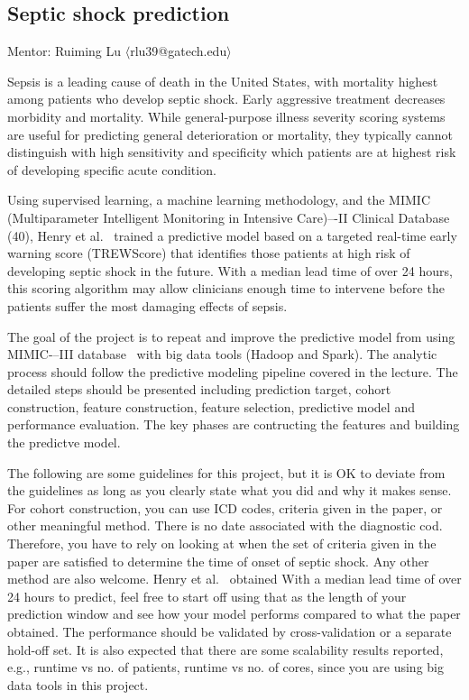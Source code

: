 \documentclass[journal]{IEEEtran}
\begin{document}
\subsection{Septic shock prediction}
Mentor: Ruiming Lu $\langle$rlu39@gatech.edu$\rangle$

Sepsis is a leading cause of death in the United States, with mortality highest among patients who develop septic shock. Early aggressive treatment decreases morbidity and mortality. While general-purpose illness severity scoring systems are useful for predicting general deterioration or mortality, they typically cannot distinguish with high sensitivity and specificity which patients are at highest risk of developing specific acute condition.

Using supervised learning, a machine learning methodology, and the MIMIC (Multiparameter Intelligent Monitoring in Intensive Care)–-II Clinical Database (40), Henry et al.~\cite{henry_targeted_2015} trained a predictive model based on a targeted real-time early warning score (TREWScore) that identifies those patients at high risk of developing septic shock in the future. With a median lead time of over 24 hours, this scoring algorithm may allow clinicians enough time to intervene before the patients suffer the most damaging effects of sepsis.

The goal of the project is to repeat and improve the predictive model from \cite{henry_targeted_2015} using MIMIC-–III database~\cite{saeed_multiparameter_2011} with big data tools (Hadoop and Spark). The analytic process should follow the predictive modeling pipeline covered in the lecture. The detailed steps should be presented including prediction target, cohort construction, feature construction, feature selection, predictive model and performance evaluation. The key phases are contructing the features and building the predictve model.

The following are some guidelines for this project, but it is OK to deviate from the guidelines as long as you clearly state what you did and why it makes sense. For cohort construction, you can use ICD codes, criteria given in the paper, or other meaningful method. There is no date associated with the diagnostic cod. Therefore, you have to rely on looking at when the set of criteria given in the paper are satisfied to determine the time of onset of septic shock. Any other method are also welcome. Henry et al.~\cite{henry_targeted_2015} obtained With a median lead time of over 24 hours to predict, feel free to start off using that as the length of your prediction window and see how your model performs compared to what the paper obtained. The performance should be validated by cross-validation or a separate hold-off set. It is also expected that there are some scalability results reported, e.g., runtime vs no. of patients, runtime vs no. of cores, since you are using big data tools in this project. 
\end{document}
